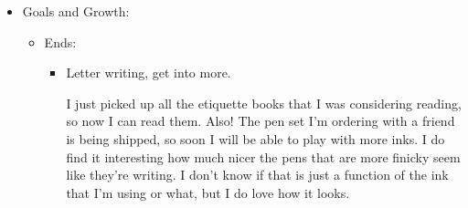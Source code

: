 \documentclass[12pt]{article}
\renewcommand{\,}{\textsuperscript{,}}
\begin{document}
\begin{itemize}
\begin{itemize}
\begin{itemize}
\item Keep the phone out of the room for bed

Nope! Hopefully after this weekend.

\item Pray St. Michael Chaplet in the morning

\item Stretch in the morning

\item Read at night

\item Poetry at night

\item Clean the home

\item Stretching, standing, drinking water

\item Posture

Decently! Not stretching enough, which isn't great.

\item No wasted time

Yesterday was a blur, and I should not have gone on the field trip to the book sale.

\item Eat more than 2 meals a day

I think so! In that I ate a giant bowl of oats, a heart of lettuce,\footnote{why does lettuce only have a head and a heart? Where's the leg?} and some rice with curry. Was the curry rice a full meal? Great question, moving on.

\end{itemize}

\end{itemize}

\item Goals and Growth:

\begin{itemize}

\item Ends:

\begin{itemize}

\item Letter writing, get into more.

I just picked up all the etiquette books that I was considering reading, so now I can read them.  
Also! The pen set I'm ordering with a friend is being shipped, so soon I will be able to play with more inks.  
I do find it interesting how much nicer the pens that are more finicky seem like they're writing.  
I don't know if that is just a function of the ink that I'm using or what, but I do love how it looks.


\end{itemize}
\end{itemize}
\end{itemize}
\end{document}

